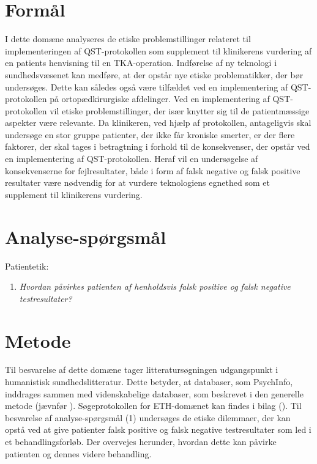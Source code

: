 \section{Formål}
I dette domæne analyseres de etiske problemstillinger relateret til implementeringen af QST-protokollen som supplement til klinikerens vurdering af en patients henvisning til en TKA-operation. Indførelse af ny teknologi i sundhedsvæsenet kan medføre, at der opstår nye etiske problematikker, der bør undersøges. Dette kan således også være tilfældet ved en implementering af QST-protokollen på ortopædkirurgiske afdelinger. Ved en implementering af QST-protokollen vil etiske problemstillinger, der især knytter sig til de patientmæssige aspekter være relevante. Da klinikeren, ved hjælp af protokollen, antageligvis skal undersøge en stor gruppe patienter, der ikke får kroniske smerter, er der flere faktorer, der skal tages i betragtning i forhold til de konsekvenser, der opstår ved en implementering af QST-protokollen. Heraf vil en undersøgelse af konsekvenserne for fejlresultater, både i form af falsk negative og falsk positive resultater være nødvendig for at vurdere teknologiens egnethed som et supplement til klinikerens vurdering.

\section{Analyse-spørgsmål}
Patientetik:
\begin{enumerate}
\item \textit{Hvordan påvirkes patienten af henholdsvis falsk positive og falsk negative testresultater?} %
\end{enumerate}

\section{Metode}
Til besvarelse af dette domæne tager litteratursøgningen udgangspunkt i humanistisk sundhedslitteratur. Dette betyder, at databaser, som PsychInfo, inddrages sammen med videnskabelige databaser, som beskrevet i den generelle metode (jævnfør ). Søgeprotokollen for ETH-domænet kan findes i bilag ().
Til besvarelse af analyse-spørgsmål (1) undersøges de etiske dilemmaer, der kan opstå ved at give patienter falsk positive og falsk negative testresultater som led i et behandlingsforløb. Der overvejes herunder, hvordan dette kan påvirke patienten og dennes videre behandling.

